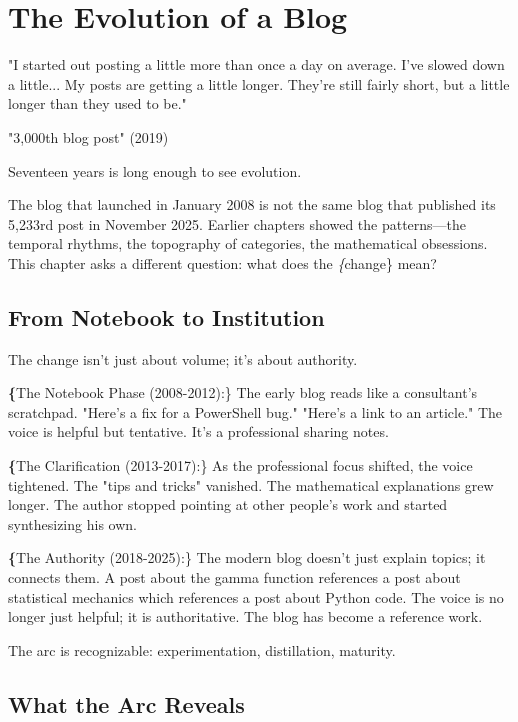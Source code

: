 \chapter{The Evolution of a Blog}

\epigraph{"I started out posting a little more than once a day on average. I've slowed down a little... My posts are getting a little longer. They're still fairly short, but a little longer than they used to be."}{"3,000th blog post" (2019)}

\bigskip

Seventeen years is long enough to see evolution.

The blog that launched in January 2008 is not the same blog that published its 5,233rd post in November 2025. Earlier chapters showed the patterns—the temporal rhythms, the topography of categories, the mathematical obsessions. This chapter asks a different question: what does the \textit\{change\} mean?

\bigskip

\section*{From Notebook to Institution}

The change isn't just about volume; it's about authority.

\textbf\{The Notebook Phase (2008-2012):\} The early blog reads like a consultant's scratchpad. "Here's a fix for a PowerShell bug." "Here's a link to an article." The voice is helpful but tentative. It's a professional sharing notes.

\textbf\{The Clarification (2013-2017):\} As the professional focus shifted, the voice tightened. The "tips and tricks" vanished. The mathematical explanations grew longer. The author stopped pointing at other people's work and started synthesizing his own.

\textbf\{The Authority (2018-2025):\} The modern blog doesn't just explain topics; it connects them. A post about the gamma function references a post about statistical mechanics which references a post about Python code. The voice is no longer just helpful; it is authoritative. The blog has become a reference work.

The arc is recognizable: experimentation, distillation, maturity.

\bigskip

\section*{What the Arc Reveals}

